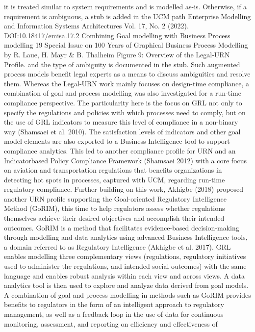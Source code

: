 it is treated similar to system requirements and
is modelled as-is. Otherwise, if a requirement
is ambiguous, a stub is added in the UCM path
Enterprise Modelling and Information Systems Architectures
Vol. 17, No. 2 (2022). DOI:10.18417/emisa.17.2
Combining Goal modelling with Business Process modelling 19
Special Issue on 100 Years of Graphical Business Process Modelling by R. Laue, H. Mayr & B. Thalheim
Figure 9: Overview of the Legal-URN Profile.
and the type of ambiguity is documented in the
stub. Such augmented process models benefit
legal experts as a means to discuss ambiguities
and resolve them.
Whereas the Legal-URN work mainly focuses
on design-time compliance, a combination of goal
and process modelling was also investigated for a
run-time compliance perspective. The particularity here is the focus on GRL not only to specify
the regulations and policies with which processes
need to comply, but on the use of GRL indicators
to measure this level of compliance in a non-binary
way (Shamsaei et al. 2010). The satisfaction levels
of indicators and other goal model elements are
also exported to a Business Intelligence tool to
support compliance analytics. This led to another
compliance profile for URN and an Indicatorbased Policy Compliance Framework (Shamsaei
2012) with a core focus on aviation and transportation regulations that benefits organizations
in detecting hot spots in processes, captured with
UCM, regarding run-time regulatory compliance.
Further building on this work, Akhigbe (2018)
proposed another URN profile supporting the
Goal-oriented Regulatory Intelligence Method
(GoRIM), this time to help regulators assess
whether regulations themselves achieve their desired objectives and accomplish their intended
outcomes. GoRIM is a method that facilitates
evidence-based decision-making through modelling and data analytics using advanced Business
Intelligence tools, a domain referred to as Regulatory Intelligence (Akhigbe et al. 2017). GRL
enables modelling three complementary views
(regulations, regulatory initiatives used to administer the regulations, and intended social outcomes)
with the same language and enables robust analysis within each view and across views. A data
analytics tool is then used to explore and analyze
data derived from goal models. A combination
of goal and process modelling in methods such
as GoRIM provides benefits to regulators in the
form of an intelligent approach to regulatory management, as well as a feedback loop in the use
of data for continuous monitoring, assessment,
and reporting on efficiency and effectiveness of
